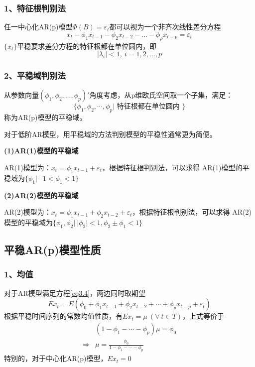 \documentclass[12pt, a4paper, oneside]{ctexbook}
\begin{document}
\subsubsection{1、特征根判别法}
任一中心化AR(p)模型$\Phi(B)=\varepsilon_t$都可以视为一个非齐次线性差分方程
\begin{equation}
    x_{t}-\phi_{1}x_{t-1}-\phi_{2}x_{t-2}-...-\phi_{\rho}x_{t-p}=\varepsilon_{t}
\end{equation}
$\{x_t\}$平稳要求差分方程的特征根都在单位圆内，即
\begin{equation}
    |\lambda_i| < 1,~i=1,2,...,p
\end{equation}

\subsubsection{2、平稳域判别法}
从参数向量$(\phi_1,\phi_2,...,\phi_p)'$角度考虑，从p维欧氏空间取一个子集，满足：
\begin{equation*}
    \{\phi_1,\phi_2,\cdots,\phi_p|\text{ 特征根都在单位圆内 }\}
\end{equation*}
称为AR(p)模型的平稳域。

对于低阶AR模型，用平稳域的方法判别模型的平稳性通常更为简便。

\textbf{(1)AR(1)模型的平稳域}

AR(1)模型为：$x_t = \phi_1x_{t-1}+\varepsilon_t$，根据特征根判别法，可以求得
AR(1)模型的平稳域为$\{\phi_1|-1<\phi_1<1\}$

\textbf{(2)AR(2)模型的平稳域}

AR(2)模型为：$x_t = \phi_1x_{t-1}+\phi_2x_{t-2}+\varepsilon_t$，根据特征根判别法，可以求得
AR(2)模型的平稳域为$\{\phi_1,\phi_2|~|\phi_2|<1,\phi_2\pm \phi_1<1\}$

\subsection{平稳AR(p)模型性质}
\subsubsection{1、均值}
对于AR模型满足方程\ref{eq3.4}，两边同时取期望
\begin{equation*}
    Ex_t=E(\phi_0+\phi_1x_{t-1}+\phi_2x_{t-2}+\cdots+\phi_px_{t-p}+\varepsilon_t)
\end{equation*}
根据平稳时间序列的常数均值性质，有$Ex_t = \mu~(\forall~t\in T)$，上式等价于
\begin{equation*}
    \begin{aligned}
                    & (1-\phi_1-\cdots-\phi_p)\mu=\phi_0        \\
        \Rightarrow & \mu=\frac{\phi_0}{1-\phi_1-\cdots-\phi_p}
    \end{aligned}
\end{equation*}
特别的，对于中心化AR(p)模型，$Ex_t=0$
\end{document}
